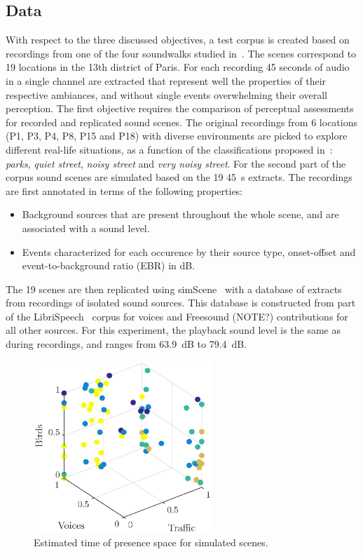 \documentclass[11pt,a4paper]{article}
\begin{document}
\subsection{Data}
\label{sec:test_data}

With respect to the three discussed objectives, a test corpus is created based on recordings from one of the four soundwalks studied in~\cite{aumond}. The scenes correspond to 19 locations in the 13th district of Paris. For each recording 45 seconds of audio in a single channel are extracted that represent well the properties of their respective ambiances, and without single events overwhelming their overall perception.
The first objective requires the comparison of perceptual assessments for recorded and replicated sound scenes. The original recordings from 6 locations (P1, P3, P4, P8, P15 and P18) with diverse environments are picked to explore different real-life situations, as a function of the classifications proposed in~\cite{jrg}: \textit{parks}, \textit{quiet street}, \textit{noisy street} and \textit{very noisy street}. For the second part of the corpus sound scenes are simulated based on the 19 45~s extracts. The recordings are first annotated in terms of the following properties:

\begin{itemize}
\item Background sources that are present throughout the whole scene, and are associated with a sound level.
\item Events characterized for each occurence by their source type, onset-offset and event-to-background ratio (EBR) in dB.
\end{itemize}

The 19 scenes are then replicated using simScene~\cite{simscene} with a database of extracts from recordings of isolated sound sources. This database is constructed from part of the LibriSpeech~\cite{libri} corpus for voices and Freesound (NOTE?) contributions for all other sources. For this experiment, the playback sound level is the same as during recordings, and ranges from 63.9~dB to 79.4~dB.\\

\begin{figure}[!h]
    \centering
    \includegraphics[width=0.6\textwidth]{figures/tvb_pres.eps}
    \caption{Estimated time of presence space for simulated scenes.}\label{fig:tvb_pres}
\end{figure}
\end{document}
